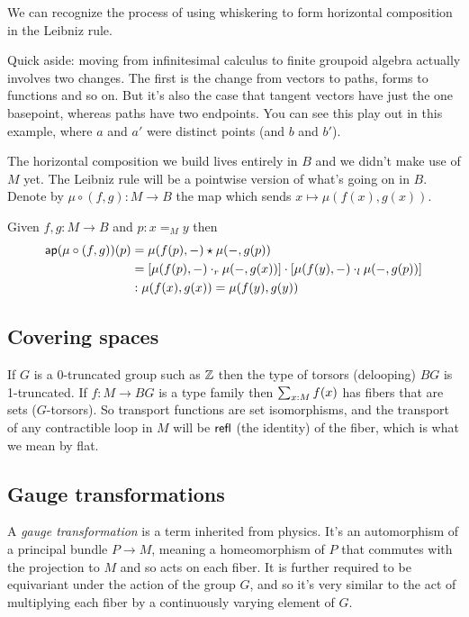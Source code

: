 We can recognize the process of using whiskering to form horizontal composition in the Leibniz rule. 

Quick aside: moving from infinitesimal calculus to finite groupoid algebra actually involves two changes. The first is the change from vectors to paths, forms to functions and so on. But it's also the case that tangent vectors have just the one basepoint, whereas paths have two endpoints. You can see this play out in this example, where \( a \) and \( a' \) were distinct points (and \( b \) and \( b' \)).

The horizontal composition we build lives entirely in \( B \) and we didn't make use of \( M \) yet. The Leibniz rule will be a pointwise version of what's going on in \( B \). Denote by \( \mu\circ(f,g):M\to B \) the map which sends \( x\mapsto \mu(f(x),g(x)) \).

\begin{mylemma}
Given \( f, g:M\to B \) and \( p:x=_M y \) then 
\begin{align*}
 \mathsf{ap}(\mu\circ(f,g))(p)&=\mu(f(p),-)\star\mu(-,g(p))\\
 &=\left[\mu(f(p),-)\cdot_r \mu(-,g(x))\right]\cdot \left[\mu(f(y),-)\cdot_l\mu(-,g(p))\right]\\
 &:\mu(f(x),g(x))=\mu(f(y),g(y))
\end{align*}
\end{mylemma}

\subsection{Covering spaces}

If \( G \) is a 0-truncated group such as \( \mathbb{Z} \) then the type of torsors (delooping) \( BG \) is 1-truncated. If \( f:M\to BG \) is a type family then \( \sum_{x:M}f(x) \) has fibers that are sets (\( G \)-torsors). So transport functions are set isomorphisms, and the transport of any contractible loop in \( M \) will be \( \mathsf{refl} \) (the identity) of the fiber, which is what we mean by flat.

\subsection{Gauge transformations}

A \emph{gauge transformation} is a term inherited from physics. It's an automorphism of a principal bundle \( P\to M \), meaning a homeomorphism of \( P \) that commutes with the projection to \( M \) and so acts on each fiber. It is further required to be equivariant under the action of the group \( G \), and so it's very similar to the act of multiplying each fiber by a continuously varying element of \( G \).

